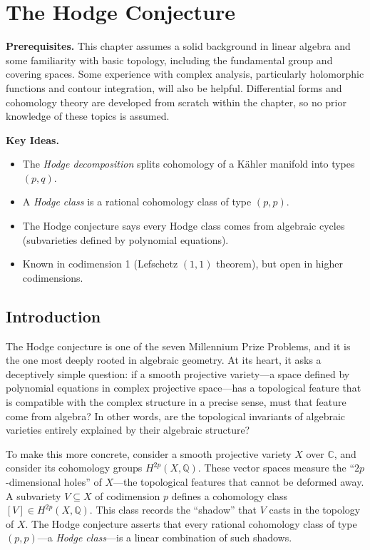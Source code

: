 \chapter{The Hodge Conjecture}
\label{ch:hodge}

\medskip\noindent\textbf{Prerequisites.} This chapter assumes a solid background in linear algebra and some familiarity with basic topology, including the fundamental group and covering spaces. Some experience with complex analysis, particularly holomorphic functions and contour integration, will also be helpful. Differential forms and cohomology theory are developed from scratch within the chapter, so no prior knowledge of these topics is assumed.

\noindent\textbf{Key Ideas.}
\begin{itemize}
  \item The \emph{Hodge decomposition} splits cohomology of a K\"{a}hler manifold into types $(p,q)$.
  \item A \emph{Hodge class} is a rational cohomology class of type $(p,p)$.
  \item The Hodge conjecture says every Hodge class comes from algebraic cycles (subvarieties defined by polynomial equations).
  \item Known in codimension 1 (Lefschetz $(1,1)$ theorem), but open in higher codimensions.
\end{itemize}

\bigskip

\section{Introduction}

The Hodge conjecture is one of the seven Millennium Prize Problems, and it is the one most deeply rooted in algebraic geometry. At its heart, it asks a deceptively simple question: if a smooth projective variety---a space defined by polynomial equations in complex projective space---has a topological feature that is compatible with the complex structure in a precise sense, must that feature come from algebra? In other words, are the topological invariants of algebraic varieties entirely explained by their algebraic structure?

To make this more concrete, consider a smooth projective variety $X$ over $\mathbb{C}$, and consider its cohomology groups $H^{2p}(X, \mathbb{Q})$. These vector spaces measure the ``$2p$-dimensional holes'' of $X$---the topological features that cannot be deformed away. A subvariety $V \subseteq X$ of codimension $p$ defines a cohomology class $[V] \in H^{2p}(X, \mathbb{Q})$. This class records the ``shadow'' that $V$ casts in the topology of $X$. The Hodge conjecture asserts that every rational cohomology class of type $(p,p)$---a \emph{Hodge class}---is a linear combination of such shadows.

